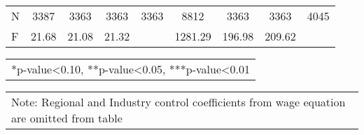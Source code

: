 \documentclass[12pt]{report}
\begin{document}
\begin{sidewaystable}
\begin{tabular}{lc|c|c|c|c|c|c|c}
\hline
N & 3387 & 3363 & 3363 & 3363 & 8812 & 3363 & 3363 & 4045\\
F & 21.68 & 21.08 & 21.32 & & 1281.29 & 196.98 & 209.62 & \\
\hline
\hline
\end{tabular}
\begin{tabular}{p{6.25in}}\footnotesize{
*p-value<0.10, **p-value<0.05, ***p-value<0.01}\\
\end{tabular}
\begin{tabular}{p{6.25in}}\footnotesize{
Note: Regional and Industry control coefficients from wage equation are omitted from table}\\
\end{tabular}
\end{sidewaystable}

\begin{comment}R-sq & 0.1571 & 0.0583 & 0.0423 & 0.0457 & 0.6454 & 0.4289 & 0.2797 & 0.5012\\
\end{comment}

\newpage
\end{document}

